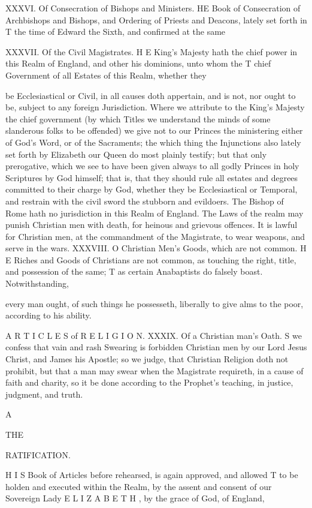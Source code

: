 XXXVI. Of Consecration of Bishops and Ministers. HE Book of Consecration of Archbishops and Bishops, and Ordering of Priests and Deacons, lately set forth in T the time of Edward the Sixth, and confirmed at the same

XXXVII. Of the Civil Magistrates. H E King’s Majesty hath the chief power in this Realm of England, and other his dominions, unto whom the T chief Government of all Estates of this Realm, whether they

be Ecclesiastical or Civil, in all causes doth appertain, and is not, nor ought to be, subject to any foreign Jurisdiction. Where we attribute to the King’s Majesty the chief government (by which Titles we understand the minds of some slanderous folks to be offended) we give not to our Princes the ministering either of God’s Word, or of the Sacraments; the which thing the Injunctions also lately set forth by Elizabeth our Queen do most plainly testify; but that only prerogative, which we see to have been given always to all godly Princes in holy Scriptures by God himself; that is, that they should rule all estates and degrees committed to their charge by God, whether they be Ecclesiastical or Temporal, and restrain with the civil sword the stubborn and evildoers. The Bishop of Rome hath no jurisdiction in this Realm of England. The Laws of the realm may punish Christian men with death, for heinous and grievous offences. It is lawful for Christian men, at the commandment of the Magistrate, to wear weapons, and serve in the wars. XXXVIII. O Christian Men’s Goods, which are not common. H E Riches and Goods of Christians are not common, as touching the right, title, and possession of the same; T as certain Anabaptists do falsely boast. Notwithstanding,

every man ought, of such things he possesseth, liberally to give alms to the poor, according to his ability.

A R T I C L E S of R E L I G I O N. XXXIX. Of a Christian man’s Oath. S we confess that vain and rash Swearing is forbidden Christian men by our Lord Jesus Christ, and James his Apostle; so we judge, that Christian Religion doth not prohibit, but that a man may swear when the Magistrate requireth, in a cause of faith and charity, so it be done according to the Prophet’s teaching, in justice, judgment, and truth.

A

THE

RATIFICATION.

H I S Book of Articles before rehearsed, is again approved, and allowed T to be holden and executed within the Realm, by the assent and consent of our Sovereign Lady E L I Z A B E T H , by the grace of God, of England,

